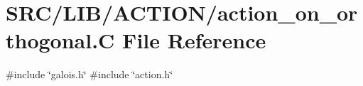 \hypertarget{action__on__orthogonal_8_c}{}\section{S\+R\+C/\+L\+I\+B/\+A\+C\+T\+I\+O\+N/action\+\_\+on\+\_\+orthogonal.C File Reference}
\label{action__on__orthogonal_8_c}
{\ttfamily \#include \char`\"{}galois.\+h\char`\"{}}\newline
{\ttfamily \#include \char`\"{}action.\+h\char`\"{}}\newline
